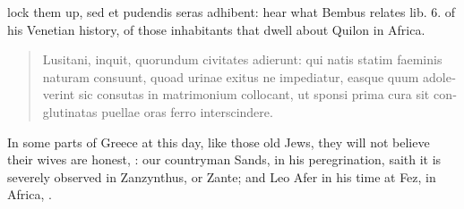 lock them up, sed et pudendis seras adhibent: hear what Bembus relates
lib. 6. of his Venetian history, of those inhabitants that dwell about
Quilon in Africa.
%
\begin{latin}%
\begin{quote}%
Lusitani, inquit, quorundum civitates adierunt: qui
natis statim faeminis naturam consuunt, quoad urinae exitus ne
impediatur, easque quum adoleverint sic consutas in matrimonium
collocant, ut sponsi prima cura sit conglutinatas puellae oras ferro
interscindere.
\end{quote}%
\end{latin}%
%
In some parts of Greece at this day, like those old Jews, they will not believe
their wives are honest, : our
countryman Sands, in his peregrination, saith it is
severely observed in Zanzynthus, or Zante; and Leo Afer in his time at Fez, in
Africa, .

